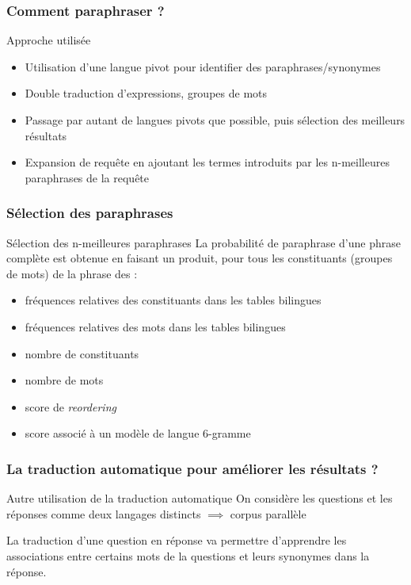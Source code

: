 \documentclass[10pt]{beamer}
\begin{document}
\begin{frame}
  \frametitle{Comment paraphraser ?}
  \begin{block}{Approche utilisée}
  \begin{itemize}
    \item Utilisation d'une langue pivot pour identifier des paraphrases/synonymes
    \item Double traduction d'expressions, groupes de mots
    \item Passage par autant de langues pivots que possible, puis sélection des meilleurs résultats
    \item Expansion de requête en ajoutant les termes introduits par les n-meilleures paraphrases de la requête
  \end{itemize}
  \end{block}
\end{frame}

\begin{frame}
  \frametitle{Sélection des paraphrases}
  \begin{block}{Sélection des n-meilleures paraphrases}
  La probabilité de paraphrase d'une phrase complète est obtenue en faisant un produit, pour tous les constituants (groupes de mots) de la phrase des :
  \begin{itemize}
    \item fréquences relatives des constituants dans les tables bilingues
    \item fréquences relatives des mots dans les tables bilingues
    \item nombre de constituants
    \item nombre de mots
    \item score de \textit{reordering}
    \item score associé à un modèle de langue 6-gramme
  \end{itemize}
  \end{block}
\end{frame}

\begin{frame}
  \frametitle{La traduction automatique pour améliorer les résultats
    ?}
  \begin{block}{Autre utilisation de la traduction automatique}
  On considère les questions et les réponses comme deux langages distincts $\implies$ corpus parallèle
  
  La traduction d'une question en réponse va permettre d'apprendre les associations entre certains mots de la questions et leurs synonymes dans la réponse.
  \end{block}
\end{frame}
\end{document}
